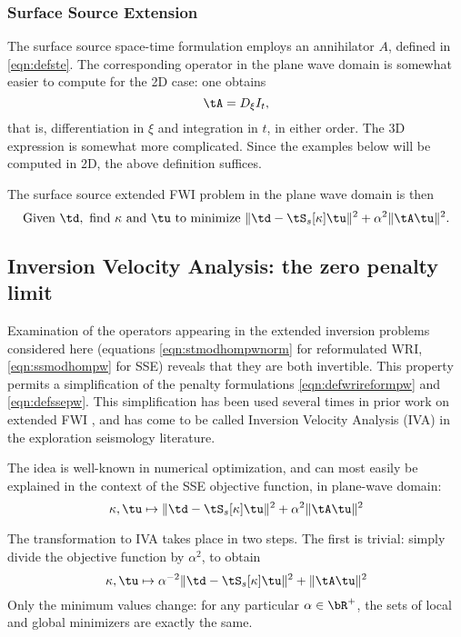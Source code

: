 \subsubsection{Surface Source Extension}

The surface source space-time formulation employs an
annihilator $A$, defined in \ref{eqn:defste}. The corresponding
operator in the plane wave domain is somewhat easier to compute for the 2D
case: one obtains 
\[
\tA = D_{\xi}I_t,
\]
that is, differentiation in $\xi$ and integration in $t$, in either
order. The 3D expression is somewhat more complicated. Since the
examples below will be computed in 2D, the above definition suffices.

The surface source extended FWI problem in the plane wave domain is then
\begin{equation}
  \label{eqn:defssepw}
  \mbox{Given } \td, \mbox{ find }\kappa \mbox{ and }\tu \mbox{ to
    minimize }
  \| \td -  \tS_s[\kappa]\tu\|^2+\alpha^2\|\tA\tu\|^2.
\end{equation}

\subsection{Inversion Velocity Analysis: the zero penalty limit}
Examination of the operators appearing in the extended inversion
problems considered here (equations \ref{eqn:stmodhompwnorm} for
reformulated WRI, \ref{eqn:ssmodhompw} for SSE) reveals that they
are both invertible. This property permits a simplification of the
penalty formulations \ref{eqn:defwrireformpw} and
\ref{eqn:defssepw}. This simplification has been used several times in
prior work on extended FWI
\cite[]{Symes:EAGE15,Herve2017,HouSymes:Geo18}, and has come to be
called Inversion Velocity Analysis (IVA) in the exploration seismology
literature.

The idea is well-known in numerical optimization, and can most easily
be explained in the context of the SSE objective function, in
plane-wave domain:
\begin{equation}
  \label{eqn:ssepen}
  \kappa,\tu \mapsto \|\td-\tS_s[\kappa]\tu\|^2 + \alpha^2\|\tA\tu\|^2
\end{equation}

The transformation to IVA takes place in two steps. The first is
trivial: simply divide the objective function by $\alpha^2$, to
obtain
\begin{equation}
  \label{eqn:ssepeninv}
  \kappa,\tu \mapsto \alpha^{-2}\|\td-\tS_s[\kappa]\tu\|^2 + \|\tA\tu\|^2
\end{equation}
Only the minimum values change: for any particular $\alpha \in
\bR^+$, the sets of local and global minimizers are exactly the same.

